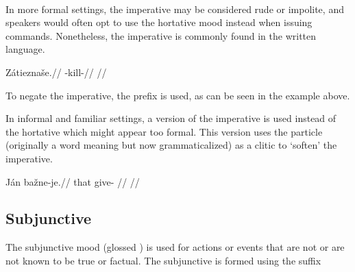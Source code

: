 \ex
{} \\
	\\
 \\
 
\xe

\ex
{} \\
	\\
 \\
 
\xe

\medskip

In more formal settings, the imperative may be considered rude or impolite, and speakers would often opt to use the hortative mood instead when issuing commands. Nonetheless, the imperative is commonly found in the written language. 

\pex
\begingl
\gla Zátiezna\v{s}e.//
\glb {}-kill-//
\glft {}//
\endgl
\xe


To negate the imperative, the prefix  is used, as can be seen in the example above.

In informal and familiar settings, a version of the imperative is used instead of the hortative which might appear too formal. This version uses the particle  (originally a word meaning  but now grammaticalized) as a clitic to `soften' the imperative.

\pex
\begingl
\gla J\'an ba\v{z}ne-je.//
\glb that give- //
\glft {}//
\endgl
\xe

\subsection{Subjunctive}

The subjunctive mood (glossed ) is used for actions or events that are not or are not known to be true or factual. The subjunctive is formed using the suffix 

